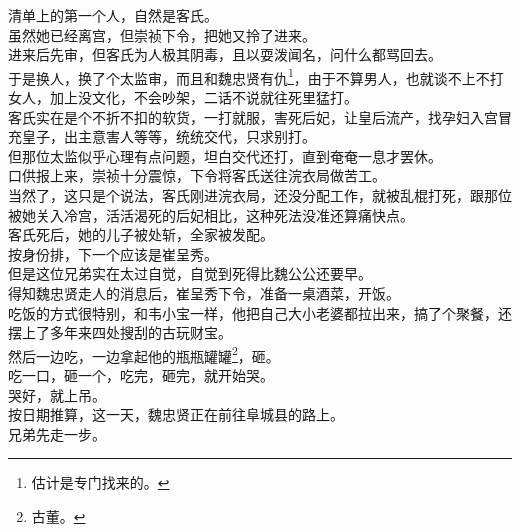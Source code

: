\begin{multicols}{\theparacolNo}
清单上的第一个人，自然是客氏。\\

虽然她已经离宫，但崇祯下令，把她又拎了进来。\\

进来后先审，但客氏为人极其阴毒，且以耍泼闻名，问什么都骂回去。\\

于是换人，换了个太监审，而且和魏忠贤有仇\footnote{估计是专门找来的。}，由于不算男人，也就谈不上不打女人，加上没文化，不会吵架，二话不说就往死里猛打。\\

客氏实在是个不折不扣的软货，一打就服，害死后妃，让皇后流产，找孕妇入宫冒充皇子，出主意害人等等，统统交代，只求别打。\\

但那位太监似乎心理有点问题，坦白交代还打，直到奄奄一息才罢休。\\

口供报上来，崇祯十分震惊，下令将客氏送往浣衣局做苦工。\\

当然了，这只是个说法，客氏刚进浣衣局，还没分配工作，就被乱棍打死，跟那位被她关入冷宫，活活渴死的后妃相比，这种死法没准还算痛快点。\\

客氏死后，她的儿子被处斩，全家被发配。\\

按身份排，下一个应该是崔呈秀。\\

但是这位兄弟实在太过自觉，自觉到死得比魏公公还要早。\\

得知魏忠贤走人的消息后，崔呈秀下令，准备一桌酒菜，开饭。\\

吃饭的方式很特别，和韦小宝一样，他把自己大小老婆都拉出来，搞了个聚餐，还摆上了多年来四处搜刮的古玩财宝。\\

然后一边吃，一边拿起他的瓶瓶罐罐\footnote{古董。}，砸。\\

吃一口，砸一个，吃完，砸完，就开始哭。\\

哭好，就上吊。\\

按日期推算，这一天，魏忠贤正在前往阜城县的路上。\\

兄弟先走一步。\\


\end{multicols}

